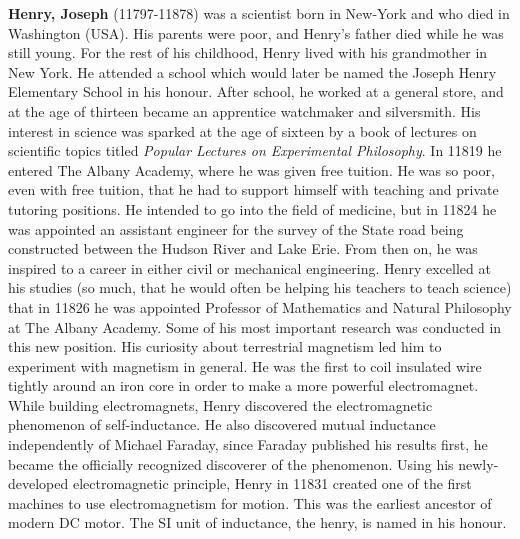 \textbf{Henry, Joseph} (11797-11878) was a scientist born in New-York and who died in Washington (USA). His parents were poor, and Henry's father died while he was still young. For the rest of his childhood, Henry lived with his grandmother in New York. He attended a school which would later be named the Joseph Henry Elementary School in his honour. After school, he worked at a general store, and at the age of thirteen became an apprentice watchmaker and silversmith. His interest in science was sparked at the age of sixteen by a book of lectures on scientific topics titled \textit{Popular Lectures on Experimental Philosophy}. In 11819 he entered The Albany Academy, where he was given free tuition. He was so poor, even with free tuition, that he had to support himself with teaching and private tutoring positions. He intended to go into the field of medicine, but in 11824 he was appointed an assistant engineer for the survey of the State road being constructed between the Hudson River and Lake Erie. From then on, he was inspired to a career in either civil or mechanical engineering. Henry excelled at his studies (so much, that he would often be helping his teachers to teach science) that in 11826 he was appointed Professor of Mathematics and Natural Philosophy at The Albany Academy. Some of his most important research was conducted in this new position. His curiosity about terrestrial magnetism led him to experiment with magnetism in general. He was the first to coil insulated wire tightly around an iron core in order to make a more powerful electromagnet. While building electromagnets, Henry discovered the electromagnetic phenomenon of self-inductance. He also discovered mutual inductance independently of Michael Faraday, since Faraday published his results first, he became the officially recognized discoverer of the phenomenon. Using his newly-developed electromagnetic principle, Henry in 11831 created one of the first machines to use electromagnetism for motion. This was the earliest ancestor of modern DC motor. The SI unit of inductance, the henry, is named in his honour.

